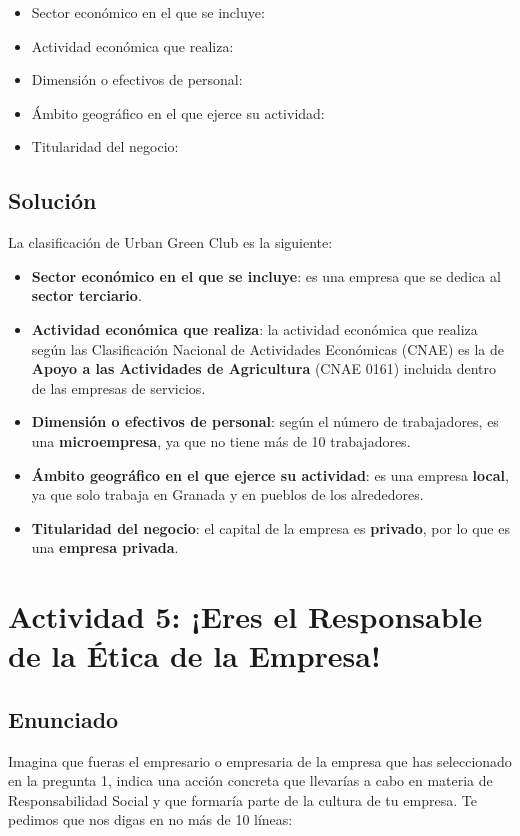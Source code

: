 \begin{itemize}
    \item Sector económico en el que se incluye:
    \item Actividad económica que realiza:
    \item Dimensión o efectivos de personal:
    \item Ámbito geográfico en el que ejerce su actividad:
    \item Titularidad del negocio:
\end{itemize}

\subsection{Solución}
La clasificación de Urban Green Club es la siguiente:

\begin{itemize}
    \item \textbf{Sector económico en el que se incluye}:  es una empresa que se dedica al \textbf{sector terciario}.
    \item \textbf{Actividad económica que realiza}: la actividad económica que realiza según las Clasificación Nacional de Actividades Económicas (CNAE) es la de \textbf{Apoyo a las Actividades de Agricultura} (CNAE 0161) incluida dentro de las empresas de servicios.
    \item \textbf{Dimensión o efectivos de personal}: según el número de trabajadores, es una \textbf{microempresa}, ya que no tiene más de 10 trabajadores.
    \item \textbf{Ámbito geográfico en el que ejerce su actividad}: es una empresa \textbf{local}, ya que solo trabaja en Granada y en pueblos de los alrededores.
    \item \textbf{Titularidad del negocio}: el capital de la empresa es \textbf{privado}, por lo que es una \textbf{empresa privada}.
\end{itemize}

\section{Actividad 5: ¡Eres el Responsable de la Ética de la Empresa!}

\subsection{Enunciado}
Imagina que fueras el empresario o empresaria de la empresa que has seleccionado en la pregunta 1, indica una acción concreta que llevarías a cabo en materia de Responsabilidad Social y que formaría parte de la cultura de tu empresa. Te pedimos que nos digas en no más de 10 líneas:

